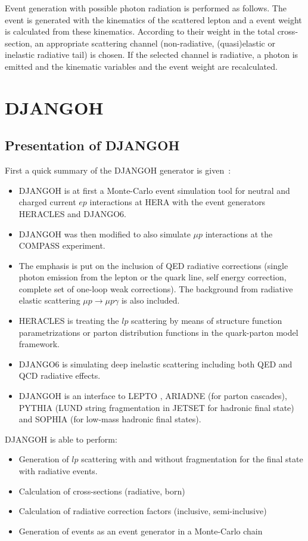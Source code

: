 Event generation with possible photon radiation is performed as follows. The event is generated with the kinematics of the scattered lepton and a event weight is calculated from these kinematics. According to their weight in the total cross-section, an appropriate scattering channel (non-radiative, (quasi)elastic or inelastic radiative tail) is chosen. If the selected channel is radiative, a photon is emitted and the kinematic variables and the event weight are recalculated.


\section{DJANGOH}

\subsection{Presentation of DJANGOH}
First a quick summary of the DJANGOH generator is given~:
\begin{itemize}
\item DJANGOH \cite{DJANGOH} is at first a Monte-Carlo event simulation tool for neutral and charged current $ep$ interactions at HERA with the event generators HERACLES and DJANGO6.
\item DJANGOH was then modified to also simulate $\mu p$ interactions at the COMPASS experiment.
\item The emphasis is put on the inclusion of QED radiative corrections (single photon emission from the lepton or the quark line, self energy correction, complete set of one-loop weak corrections). The background from radiative elastic scattering $\mu p\rightarrow \mu p\gamma$ is also included.
\item HERACLES is treating the $lp$ scattering by means of structure function parametrizations or parton distribution functions in the quark-parton model framework.
\item DJANGO6 is simulating deep inelastic scattering including both QED and QCD radiative effects.
\item DJANGOH is an interface to LEPTO \cite{LEPTO}, ARIADNE \cite{ARIADNE} (for parton cascades), PYTHIA \cite{PYTHIA6} (LUND string fragmentation in JETSET \cite{JETSET} for hadronic final state) and SOPHIA \cite{SOPHIA} (for low-mass hadronic final states).
\end{itemize}
DJANGOH is able to perform:
\begin{itemize}
\item Generation of $lp$ scattering with and without fragmentation for the final state with radiative events.
\item Calculation of cross-sections (radiative, born)
\item Calculation of radiative correction factors (inclusive, semi-inclusive)
\item Generation of events as an event generator in a Monte-Carlo chain
\end{itemize}

